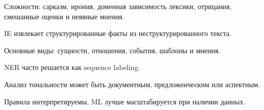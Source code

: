Сложности: сарказм, ирония, доменная зависимость лексики, отрицания, смешанные оценки и неявные мнения.

\begin{important}
    \item IE извлекает структурированные факты из неструктурированного текста.
    \item Основные виды: сущности, отношения, события, шаблоны и мнения.
    \item NER часто решается как sequence labeling.
    \item Анализ тональности может быть документным, предложенческим или аспектным.
    \item Правила интерпретируемы, ML лучше масштабируется при наличии данных.
\end{important}

